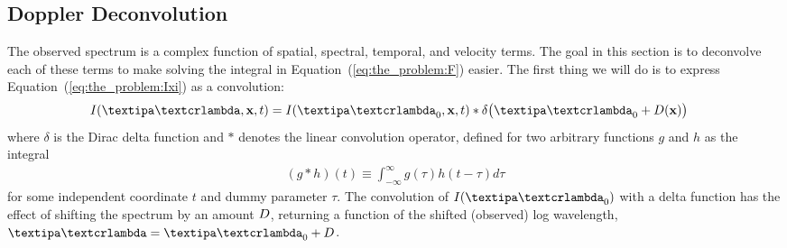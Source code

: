 \documentclass[modern]{aastex631}
\begin{document}
\subsection{Doppler Deconvolution}

The observed spectrum is a complex function of spatial, spectral, temporal, and velocity terms. 
The goal in this section is to deconvolve each of these terms to make solving the integral in Equation~(\ref{eq:the_problem:F}) easier.
%
The first thing we will do is to express Equation~(\ref{eq:the_problem:Ixi})
as a convolution:
%
\begin{align}
    \label{eq:deconv:convolution}
    I(\lnlam, \x, t) & =
    I(\lnlam_0, \x, t)
    *
    \delta\big(\lnlam_0 + \D(\x)\big)
\end{align}
%
where $\delta$ is the Dirac delta function and $*$ denotes the linear convolution operator, defined for two arbitrary functions $g$ and $h$ as the integral
%
\begin{align}
    \label{eq:deconv:convolution_def}
    (g * h)(t) \equiv \int_{-\infty}^\infty g(\tau) h(t - \tau) d\tau
\end{align}
%
for some independent coordinate $t$ and dummy parameter $\tau$.
%
The convolution of $I(\lnlam_0)$ with a delta function has the effect of shifting the spectrum by an amount $D$, returning a function of the shifted (observed) log wavelength, $\lnlam = \lnlam_0 + \D$.
\end{document}
